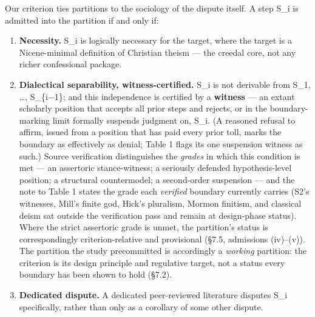 Our criterion ties partitions to the sociology of the dispute itself. A step S\_i is admitted into the partition if and only if:

\begin{enumerate}
\def\labelenumi{\arabic{enumi}.}
\tightlist
\item
  \textbf{Necessity.} S\_i is logically necessary for the target, where the target is a Nicene-minimal definition of Christian theism --- the creedal core, not any richer confessional package.
\item
  \textbf{Dialectical separability, witness-certified.} S\_i is not derivable from S\_1, \ldots, S\_\{i$-$1\}; and this independence is certified by a \textbf{witness} --- an extant scholarly position that accepts all prior steps and rejects, or in the boundary-marking limit formally suspends judgment on, S\_i. (A reasoned refusal to affirm, issued from a position that has paid every prior toll, marks the boundary as effectively as denial; Table 1 flags its one suspension witness as such.) Source verification distinguishes the \emph{grades} in which this condition is met --- an assertoric stance-witness; a seriously defended hypothesis-level position; a structural countermodel; a second-order suspension --- and the note to Table 1 states the grade each \emph{verified} boundary currently carries (S2's witnesses, Mill's finite god, Hick's pluralism, Mormon finitism, and classical deism sat outside the verification pass and remain at design-phase status). Where the strict assertoric grade is unmet, the partition's status is correspondingly criterion-relative and provisional (\S{}7.5, admissions (iv)--(v)). The partition the study precommitted is accordingly a \emph{working} partition: the criterion is its design principle and regulative target, not a status every boundary has been shown to hold (\S{}7.2).
\item
  \textbf{Dedicated dispute.} A dedicated peer-reviewed literature disputes S\_i specifically, rather than only as a corollary of some other dispute.
\end{enumerate}

